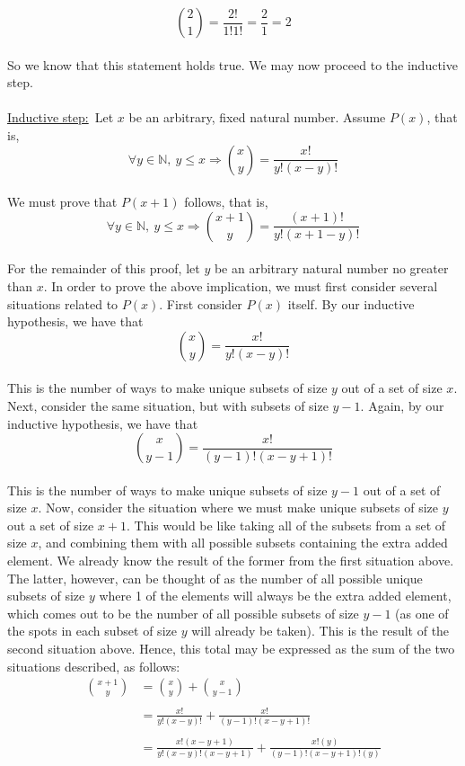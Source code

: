 \documentclass{article}
\newcommand{\N}{\mathbb{N}}
\begin{document}
\begin{enumerate}
	 $${{2}\choose{1}} = \frac{2!}{1!1!} = \frac{2}{1} = 2$$  \\ 
	 So we know that this statement holds true. We may now proceed to the inductive step. \\\\
	 \underline{Inductive step:}\ Let $x$ be an arbitrary, fixed natural number. Assume $P(x)$, that is, 
	 $$\forall y \in \N,\ y \leq x \Rightarrow {{x}\choose{y}} = \frac{x!}{y!(x-y)!}$$ \\
	 We must prove that $P(x+1)$ follows, that is, 
	 $$\forall y \in \N,\ y \leq x \Rightarrow {{x+1}\choose{y}} = \frac{(x+1)!}{y!(x+1-y)!}$$ \\
	 For the remainder of this proof, let $y$ be an arbitrary natural number no greater than $x$. In order to prove the above implication, we must first consider several situations related to $P(x)$. First consider $P(x)$ itself. By our inductive hypothesis, we have that $${{x}\choose{y}} = \frac{x!}{y!(x-y)!}$$ \\
	 This is the number of ways to make unique subsets of size $y$ out of a set of size $x$. Next, consider the same situation, but with subsets of size $y-1$. Again, by our inductive hypothesis, we have that $${{x}\choose{y-1}} = \frac{x!}{(y-1)!(x-y+1)!}$$ \\
	 This is the number of ways to make unique subsets of size $y-1$ out of a set of size $x$. Now, consider the situation where we must make unique subsets of size $y$ out a set of size $x+1$. This would be like taking all of the subsets from a set of size $x$, and combining them with all possible subsets containing the extra added element. We already know the result of the former from the first situation above. The latter, however, can be thought of as the number of all possible unique subsets of size $y$ where 1 of the elements will always be the extra added element, which comes out to be the number of all possible subsets of size $y-1$ (as one of the spots in each subset of size $y$ will already be taken). This is the result of the second situation above. Hence, this total may be expressed as the sum of the two situations described, as follows:
	 \begin{align*}
	 	{{x+1}\choose{y}} &= {{x}\choose{y}} + {{x}\choose{y-1}} \\\\
	 	&= \frac{x!}{y!(x-y)!} + \frac{x!}{(y-1)!(x-y+1)!} \\\\
	 	&= \frac{x!(x-y+1)}{y!(x-y)!(x-y+1)} + \frac{x!(y)}{(y-1)!(x-y+1)!(y)} \\\\

\end{align*}
\end{enumerate}
\end{document}

